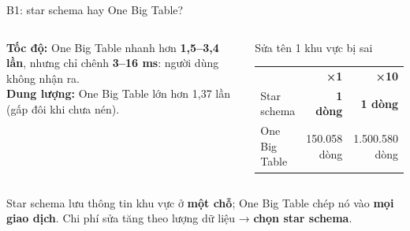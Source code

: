 \documentclass[aspectratio=169,11pt]{beamer}
\begin{document}
\begin{frame}{B1: star schema hay One Big Table?}
  \begin{columns}[T]
    \small
    \textbf{Tốc độ:} One Big Table nhanh hơn \textbf{1,5--3,4 lần}, nhưng chỉ chênh \textbf{3--16 ms}: người dùng không nhận ra.\\[6pt]
    \textbf{Dung lượng:} One Big Table lớn hơn 1,37 lần (gấp đôi khi chưa nén).
    \begin{block}{Sửa tên 1 khu vực bị sai}
      \scriptsize
      \setlength{\tabcolsep}{3pt}
      \begin{tabular}{l r r}
        & \textbf{×1} & \textbf{×10} \\
        Star schema & \textbf{1 dòng} & \textbf{1 dòng} \\
        One Big Table & 150.058 dòng & 1.500.580 dòng \\
      \end{tabular}
    \end{block}
  \end{columns}
  \bigskip

  \small Star schema lưu thông tin khu vực ở \textbf{một chỗ}; One Big Table chép nó vào \textbf{mọi giao dịch}. Chi phí sửa tăng theo lượng dữ liệu → \textbf{chọn star schema}.
\end{frame}
\end{document}
